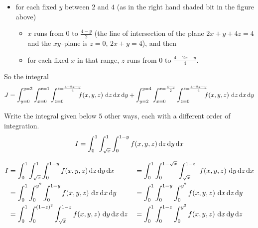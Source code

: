 \begin{solution}
\begin{itemize}
\item
for each fixed $y$ between $2$ and $4$ (as in the right hand shaded bit in
the figure above)
\begin{itemize}
\item 
$x$ runs from $0$ to $\frac{4-y}{2}$ (the line of intersection of the
plane $2x+y+4z=4$ and the $xy$--plane is $z=0$, $2x+y=4$), and then
\item
for each fixed $x$ in that range, $z$ runs from $0$ to $\frac{4-2x-y}{4}$. 
\end{itemize}
\end{itemize}
So the integral 
\begin{align*}
J = \int_{y=0}^{y=2} \int_{x=0}^{x=1} \int_{z=0}^{z=\frac{4-2x-y}{4}}
        \!\!\!\! f(x,y,z)  \ \dee{z}\,\dee{x}\,\dee{y}
+\int_{y=2}^{y=4} \int_{x=0}^{x=\frac{4-y}{2}} \int_{z=0}^{z=\frac{4-2x-y}{4}} 
        \!\!\!\!  f(x,y,z)\ \dee{z}\,\dee{x}\,\dee{y}
\end{align*}
\end{solution}


\begin{question}[M200 2008A] %
Write the integral given below $5$ other ways, each with a different 
order of integration.
\begin{equation*}
I=\int_0^1 \int_{\sqrt{x}}^1 \int_0^{1-y} f(x,y,z)\,\mathrm{d}z\,\mathrm{d}y\,\mathrm{d}x
\end{equation*}
\end{question}

%

\begin{answer}
\begin{alignat*}{3}
I&= \int_0^1 \int_{\sqrt{x}}^1 \int_0^{1-y} f(x,y,z)\,\dee{z}\,\dee{y}\,\dee{x}
&&=\int_0^1 \int_0^{1-\sqrt{x}} \int_{\sqrt{x}}^{1-z}
                \ f(x,y,z)\  \dee{y}\,\dee{z}\,\dee{x} \\
&=\int_0^1  \int_0^{y^2}\int_0^{1-y}f(x,y,z)\ 
                   \dee{z}\,\dee{x}\, \dee{y}
&&=\int_0^1  \int_0^{1-y} \int_0^{y^2} f(x,y,z)\ 
                   \dee{x}\, \dee{z}\,\dee{y} \\
&=\int_0^1  \int_0^{(1-z)^2} \int_{\sqrt{x}}^{1-z}f(x,y,z)\ 
                   \dee{y}\,\dee{x}\, \dee{z}
&&=\int_0^1  \int_0^{1-z} \int_0^{y^2} f(x,y,z)\ 
                   \dee{x}\, \dee{y}\,\dee{z}
\end{alignat*}
\end{answer}

